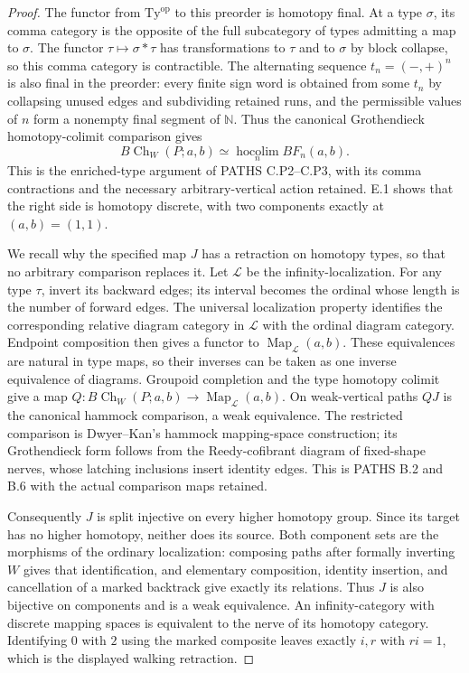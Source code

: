 \begin{proof}
The functor from $\mathrm{Ty}^{\mathrm{op}}$ to this preorder is homotopy final. At a type $\sigma$, its comma category is the opposite of the full subcategory of types admitting a map to $\sigma$. The functor $\tau\mapsto\sigma*\tau$ has transformations to $\tau$ and to $\sigma$ by block collapse, so this comma category is contractible. The alternating sequence $t_n=(-,+)^n$ is also final in the preorder: every finite sign word is obtained from some $t_n$ by collapsing unused edges and subdividing retained runs, and the permissible values of $n$ form a nonempty final segment of $\mathbb N$. Thus the canonical Grothendieck homotopy-colimit comparison gives
\[
 B\operatorname{Ch}_W(P;a,b)\simeq\operatorname*{hocolim}_n BF_n(a,b).
\]
This is the enriched-type argument of PATHS C.P2--C.P3, with its comma contractions and the necessary arbitrary-vertical action retained. E.1 shows that the right side is homotopy discrete, with two components exactly at $(a,b)=(1,1)$.

We recall why the specified map $J$ has a retraction on homotopy types, so that no arbitrary comparison replaces it. Let $\mathcal L$ be the infinity-localization. For any type $\tau$, invert its backward edges; its interval becomes the ordinal whose length is the number of forward edges. The universal localization property identifies the corresponding relative diagram category in $\mathcal L$ with the ordinal diagram category. Endpoint composition then gives a functor to $\operatorname{Map}_{\mathcal L}(a,b)$. These equivalences are natural in type maps, so their inverses can be taken as one inverse equivalence of diagrams. Groupoid completion and the type homotopy colimit give a map
$Q:B\operatorname{Ch}_W(P;a,b)\to\operatorname{Map}_{\mathcal L}(a,b)$.
On weak-vertical paths $QJ$ is the canonical hammock comparison, a weak equivalence. The restricted comparison is Dwyer--Kan's hammock mapping-space construction; its Grothendieck form follows from the Reedy-cofibrant diagram of fixed-shape nerves, whose latching inclusions insert identity edges. This is PATHS B.2 and B.6 with the actual comparison maps retained.

Consequently $J$ is split injective on every higher homotopy group. Since its target has no higher homotopy, neither does its source. Both component sets are the morphisms of the ordinary localization: composing paths after formally inverting $W$ gives that identification, and elementary composition, identity insertion, and cancellation of a marked backtrack give exactly its relations. Thus $J$ is also bijective on components and is a weak equivalence. An infinity-category with discrete mapping spaces is equivalent to the nerve of its homotopy category. Identifying $0$ with $2$ using the marked composite leaves exactly $i,r$ with $ri=1$, which is the displayed walking retraction.
\end{proof}

